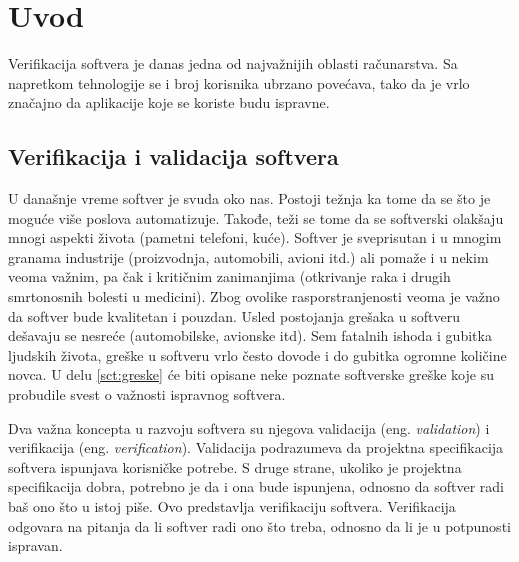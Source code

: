 \documentclass[12pt,oneside]{memoir}
\begin{document}
\frontmatter
\naslovna
\komisija
\tableofcontents*

\mainmatter

\chapter{Uvod}
Verifikacija softvera je danas jedna od najvažnijih oblasti računarstva. Sa napretkom tehnologije se i broj korisnika ubrzano povećava, tako da je vrlo značajno da aplikacije koje se koriste budu ispravne.

\section{Verifikacija i validacija softvera}
U današnje vreme softver je svuda oko nas. Postoji težnja ka tome da se što je moguće više poslova automatizuje. Takođe, teži se tome da se softverski olakšaju mnogi aspekti života (pametni telefoni, kuće). Softver je sveprisutan i u mnogim granama industrije (proizvodnja, automobili, avioni itd.) ali pomaže i u nekim veoma važnim, pa čak i kritičnim zanimanjima (otkrivanje raka i drugih smrtonosnih bolesti u medicini). Zbog ovolike rasporstranjenosti veoma je važno da softver bude kvalitetan i pouzdan. Usled postojanja grešaka u softveru dešavaju se nesreće (automobilske, avionske itd). Sem fatalnih ishoda i gubitka ljudskih života, greške u softveru vrlo često dovode i do gubitka ogromne količine novca. U delu \ref{sct:greske} će biti opisane neke poznate softverske greške koje su probudile svest o važnosti ispravnog softvera. 

Dva važna koncepta u razvoju softvera su njegova validacija (eng. \textit{validation}) i verifikacija (eng. \textit{verification}). Validacija podrazumeva da projektna specifikacija softvera ispunjava korisničke potrebe. S druge strane, ukoliko je projektna specifikacija dobra, potrebno je da i ona bude ispunjena, odnosno da softver radi baš ono što u istoj piše. Ovo predstavlja verifikaciju softvera. Verifikacija odgovara na pitanja da li softver radi ono što treba, odnosno da li je u potpunosti ispravan. 
 
\end{document}
